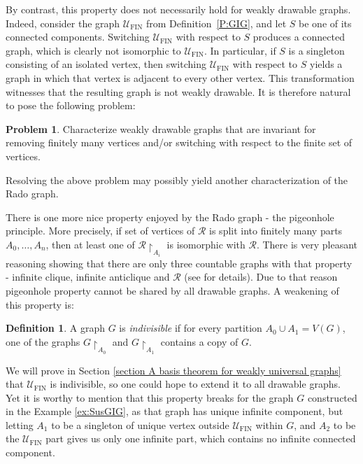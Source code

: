 \documentclass{amsart}
\theoremstyle{plain}
\theoremstyle{definition}
\newtheorem{df}[theorem]{Definition}
\newtheorem{prob}[theorem]{Problem}
\theoremstyle{remark}
\numberwithin{equation}{section}
\newcommand{\mc}{\mathcal}
\newcommand{\UU}{\mathcal{U}}
\DeclareMathOperator{\fin}{FIN}
\begin{document}
By contrast, this property does not necessarily hold for weakly drawable graphs.  Indeed, consider the graph \(\UU_{\fin}\) from Definition~\ref{P:GIG}, and let \(S\) be one of its connected components.  Switching \(\UU_{\fin}\) with respect to \(S\) produces a connected graph, which is clearly not isomorphic to \(\UU_{\fin}\).  In particular, if \(S\) is a singleton consisting of an isolated vertex, then switching \(\UU_{\fin}\) with respect to \(S\) yields a graph in which that vertex is adjacent to every other vertex. This transformation witnesses that the resulting graph is not weakly drawable.  It is therefore natural to pose the following problem:

\begin{prob}
Characterize weakly drawable graphs that are invariant for removing finitely many vertices and/or switching with respect to the finite set of vertices.
\end{prob}

Resolving the above problem may possibly yield another characterization of the Rado graph.

There is one more nice property enjoyed by the Rado graph - the pigeonhole principle. More precisely, if set of vertices of $\mc{R}$ is split into finitely many parts $A_0,\ldots, A_n$, then at least one of $\mc{R}\restriction_{A_i}$ is isomorphic with $\mc{R}$. There is very pleasant reasoning showing that there are only three countable graphs with that property - infinite clique, infinite anticlique and $\mc{R}$ (see \cite[Propostion 4]{Cameron_the_random_graph} for details). Due to that reason pigeonhole property cannot be shared by all drawable graphs. A weakening of this property is:
\begin{df}\label{wl:szuflada} 
A graph $G$ is \emph{indivisible} if for every partition $A_0\cup A_1 =V(G)$, one of the graphs $G\restriction_{A_0}$ and $G\restriction_{A_1}$ contains a copy of $G$.
\end{df}
We will prove in Section \ref{section A basis theorem for weakly universal graphs} that \(\UU_{\fin}\) is indivisible, so one could hope to extend it to all drawable graphs. Yet it is worthy to mention that this property breaks for the graph $G$ constructed in the Example \ref{ex:SusGIG}, as that graph has unique infinite component, but letting $A_1$ to be a singleton of unique vertex outside $\UU_{\fin}$ within $G$, and $A_2$ to be the $\UU_{\fin}$ part gives us only one infinite part, which contains no infinite connected component.  
\end{document}
